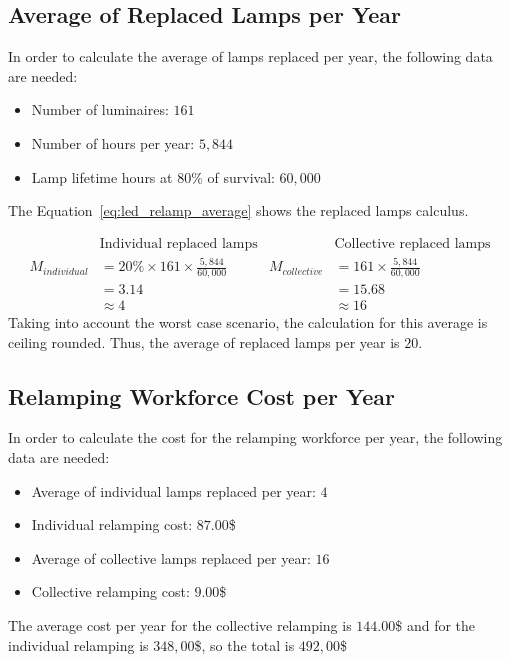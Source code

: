 \subsection{Average of Replaced Lamps per Year}
In order to calculate the average of lamps replaced per year, the following data are needed:
\begin{itemize}
\item Number of luminaires: $161$
\item Number of hours per year: $5,844$
\item Lamp lifetime hours at $80\%$ of survival: $60,000$
\end{itemize}

The Equation~\ref{eq:led_relamp_average} shows the replaced lamps calculus.

\begin{equation}
\begin{split}
 & \text{Individual replaced lamps} \\
M_{individual} & = 20\% \times 161 \times \frac{5,844}{60,000} \\
 & = 3.14 \\
 & \approx 4
\end{split}
\begin{split}
 & \text{Collective replaced lamps} \\
M_{collective} & = 161 \times \frac {5,844}{60,000} \\
 & = 15.68 \\
 & \approx 16
\end{split}
\label{eq:led_relamp_average}
\end{equation}
Taking into account the worst case scenario, the calculation for this average is ceiling rounded. Thus, the average of replaced lamps per year is $20$.

\subsection{Relamping Workforce Cost per Year}
In order to calculate the cost for the relamping workforce per year, the following data are needed:
\begin{itemize}
\item Average of individual lamps replaced per year: $4$
\item Individual relamping cost: $87.00$\$
\item Average of collective lamps replaced per year: $16$
\item Collective relamping cost: $9.00$\$
\end{itemize}
The average cost per year for the collective relamping is $144.00$\$ and for the individual relamping is $348,00$\$, so the total is $492,00$\$


